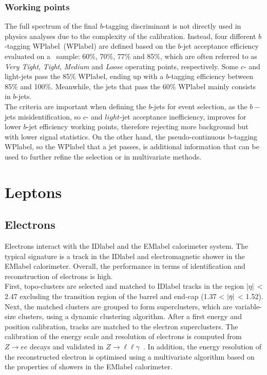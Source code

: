 \subsubsection{Working points}

The full spectrum of the final $b$-tagging discriminant is not directly used in physics analyses due to the complexity of the calibration. Instead, four different $b$-tagging \acrlong{WPlabel}~(\acrshort{WPlabel}) are defined based on the $b$-jet acceptance efficiency evaluated on a \ttbar\ sample: 60\%, 70\%, 77\% and 85\%, which are often referred to as \textit{Very Tight}, \textit{Tight}, \textit{Medium} and \textit{Loose} operating points, respectively. Some $c$- and light-jets pass the 85\% \acrshort{WPlabel}, ending up with a $b$-tagging efficiency between 85\% and 100\%. Meanwhile, the jets that pass the 60\% \acrshort{WPlabel} mainly consists in $b$-jets.\\

The criteria are important when defining the $b$-jets for event selection, as the $b-$jets misidentification, so $c$- and $light$-jet acceptance inefficiency, improves for lower $b$-jet efficiency working points, therefore rejecting more background but with lower signal statistics. On the other hand, the pseudo-continuous b-tagging \acrshort{WPlabel}, so the \acrshort{WPlabel} that a jet passes, is additional information that can be used to further refine the selection or in multivariate methods.

\clearpage
\section{Leptons}

\subsection{Electrons}

Electrons interact with the \acrshort{IDlabel} and the \acrshort{EMlabel} calorimeter system. The typical signature is a track in the \acrshort{IDlabel} and electromagnetic shower in the \acrshort{EMlabel} calorimeter. Overall, the performance in terms of identification and reconstruction of electrons is high.\\

First, topo-clusters are selected and matched to \acrshort{IDlabel} tracks in the region $\abs{\eta}$ < 2.47 excluding the transition region of the barrel and end-cap (1.37 < $\abs{\eta}$ < 1.52). Next, the matched clusters are grouped to form superclusters, which are variable-size clusters, using a dynamic clustering algorithm. After a first energy and position calibration, tracks are matched to the electron superclusters. The calibration of the energy scale and resolution of electrons is computed from $Z\rightarrow ee$ decays and validated in $Z\rightarrow \ell\ell\gamma$~\cite{performanceEgamma}. In addition, the energy resolution of the reconstructed electron is optimised using a multivariate algorithm based on the properties of showers in the \acrshort{EMlabel} calorimeter.\\

